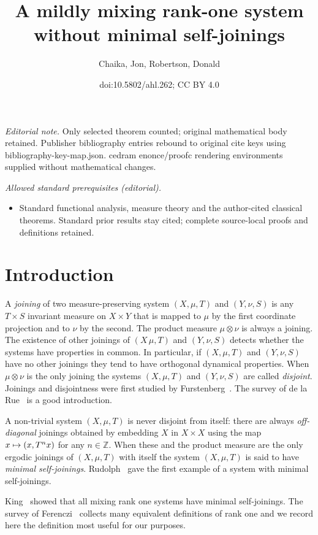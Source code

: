 \documentclass[10pt]{amsart}
\title{A mildly mixing rank-one system without minimal self-joinings}
\author{Chaika, Jon, Robertson, Donald}
\date{doi:10.5802/ahl.262; CC BY 4.0}
\theoremstyle{definition}\newtheorem{defi}[theo]{Definition}\newtheorem{rema}[theo]{Remark}\newtheorem{exam}[theo]{Example}\newtheorem{exem}[theo]{Example}\newtheorem{nota}[theo]{Notation}
\newcommand{\Z}{\mathbb{Z}}
\let\oldmapsto\mapsto
\renewcommand*{\mapsto}{\mathchoice{\longmapsto}{\oldmapsto}{\oldmapsto}{\oldmapsto}}
\begin{document}
\maketitle
\noindent\textit{Editorial note.} Only selected theorem counted; original mathematical body retained. Publisher bibliography entries rebound to original cite keys using bibliography-key-map.json. cedram enonce/proofc rendering environments supplied without mathematical changes.\par\medskip
\noindent\textit{Allowed standard prerequisites (editorial).}\begin{itemize}
\item Standard functional analysis, measure theory and the author-cited classical theorems. Standard prior results stay cited; complete source-local proofs and definitions retained.
\end{itemize}\medskip



\section{Introduction}

A \emph{joining} of two measure-preserving system $(X,\mu,T)$ and $(Y, \nu,S)$ is any $T \times S$ invariant measure on $X \times Y$ that is mapped to $\mu$ by the first coordinate projection and to $\nu$ by the second. The product measure $\mu \otimes \nu$ is always a joining. The existence of other joinings of $(X\,\mu,T)$ and $(Y,\nu,S)$ detects whether the systems have properties in common. In particular, if $(X,\mu,T)$ and $(Y,\nu,S)$ have no other joinings they tend to have orthogonal dynamical properties. When $\mu \otimes \nu$ is the only joining the systems $(X,\mu,T)$ and $(Y,\nu,S)$ are called
\emph{disjoint}. Joinings and disjointness were first studied by Furstenberg~\cite{MR0213508}. The survey of de la Rue~\cite{MR4647076} is a good introduction.

A non-trivial system $(X,\mu,T)$ is never disjoint from itself: there are always
\emph{off-diagonal} joinings obtained by embedding $X$ in $X \times X$ using the map $x \mapsto (x,T^n x)$ for any $n \in \Z$. When these and the product measure are the only ergodic joinings of $(X,\mu,T)$ with itself the system $(X,\mu,T)$ is said to have
\emph{minimal self-joinings}. Rudolph~\cite{MR0555301} gave the first example of a system with minimal self-joinings.

King~\cite{MR0963154} showed that all mixing rank one systems have minimal self-joinings. The survey of Ferenczi~\cite{MR1436950} collects many equivalent definitions of rank one and we record here the definition most useful for our purposes.
\end{document}
